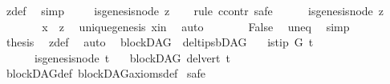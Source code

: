 \begin{isabellebody}
\ z{\isacharunderscore}{\kern0pt}def\ \isamarkupfalse%
\ simp\isanewline
\ \ \isamarkupfalse%
\ {\isachardoublequoteopen}{\isasymnot}\ is{\isacharunderscore}{\kern0pt}genesis{\isacharunderscore}{\kern0pt}node\ z{\isachardoublequoteclose}\isanewline
\ \ \isamarkupfalse%
\ {\isacharparenleft}{\kern0pt}rule\ ccontr{\isacharcomma}{\kern0pt}\ safe{\isacharparenright}{\kern0pt}\isanewline
\ \ \ \ \isamarkupfalse%
\ {\isachardoublequoteopen}is{\isacharunderscore}{\kern0pt}genesis{\isacharunderscore}{\kern0pt}node\ z{\isachardoublequoteclose}\isanewline
\ \ \ \ \isamarkupfalse%
\ \isamarkupfalse%
\ {\isachardoublequoteopen}x\ {\isacharequal}{\kern0pt}\ z{\isachardoublequoteclose}\ \isamarkupfalse%
\ unique{\isacharunderscore}{\kern0pt}genesis\ x{\isacharunderscore}{\kern0pt}in\ \isamarkupfalse%
\ auto\isanewline
\ \ \ \ \isamarkupfalse%
\ \isamarkupfalse%
\ False\ \isamarkupfalse%
\ uneq\ \isamarkupfalse%
\ simp\isanewline
\ \ \isamarkupfalse%
\isanewline
\ \ \isamarkupfalse%
\ \isamarkupfalse%
\ {\isachardoublequoteopen}{\isacharquery}{\kern0pt}thesis{\isachardoublequoteclose}\ \isamarkupfalse%
\ z{\isacharunderscore}{\kern0pt}def\ \isamarkupfalse%
\ auto\isanewline
{}\isamarkupfalse%
%
\endisatagproof
{\isafoldproof}%
%
\isadelimproof
\isanewline
%
\endisadelimproof
\isanewline
{}\isamarkupfalse%
\ {\isacharparenleft}{\kern0pt}\ blockDAG{\isacharparenright}{\kern0pt}\ \ del{\isacharunderscore}{\kern0pt}tips{\isacharunderscore}{\kern0pt}bDAG{\isacharcolon}{\kern0pt}\isanewline
\ \ \ {\isachardoublequoteopen}is{\isacharunderscore}{\kern0pt}tip\ G\ t{\isachardoublequoteclose}\isanewline
\ \ \ \ \ {\isachardoublequoteopen}\ {\isasymnot}is{\isacharunderscore}{\kern0pt}genesis{\isacharunderscore}{\kern0pt}node\ t{\isachardoublequoteclose}\isanewline
\ \ \ {\isachardoublequoteopen}blockDAG\ {\isacharparenleft}{\kern0pt}del{\isacharunderscore}{\kern0pt}vert\ t{\isacharparenright}{\kern0pt}{\isachardoublequoteclose}\isanewline
%
\isadelimproof
\ \ %
\endisadelimproof
%
\isatagproof
{}\isamarkupfalse%
\ blockDAG{\isacharunderscore}{\kern0pt}def\ blockDAG{\isacharunderscore}{\kern0pt}axioms{\isacharunderscore}{\kern0pt}def\isanewline
{}\isamarkupfalse%
\ safe\isanewline

\end{isabellebody}
